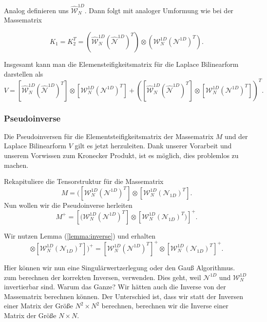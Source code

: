 Analog definieren uns $\widehat{\mathcal{W}}^{1D}_N$.
Dann folgt mit analoger Umformung wie bei der Massematrix

\begin{equation}
K_1 = K_2^T = (\widehat{\mathcal{W}}_N^{1D} (\widehat{\mathcal{N}}^{1D})^T) \otimes (\mathcal{W}_N^{1D} (\mathcal{N}^{1D})^T).
\end{equation}


Insgesamt kann man die Elemensteifigkeitsmatrix für die Laplace Bilinearform darstellen als
\begin{equation}
V =[\widehat{\mathcal{W}}_N^{1D} (\widehat{\mathcal{N}}^{1D})^T] \otimes [\mathcal{W}_N^{1D} (\mathcal{N}^{1D})^T] + ([\widehat{\mathcal{W}}_N^{1D} (\widehat{\mathcal{N}}^{1D})^T] \otimes [\mathcal{W}_N^{1D} (\mathcal{N}^{1D})^T])^T.
\end{equation}


\subsubsection{Pseudoinverse}

Die Pseudoinversen für die Elementsteifigkeitsmatrix der Massematrix $M$ und der Laplace Bilinearform $V$ gilt es jetzt herzuleiten. Dank unserer Vorarbeit und unserem Vorwissen zum Kronecker Produkt, ist es möglich, dies problemlos zu machen.

Rekapituliere die Tensorstruktur für die Massematrix
\begin{equation}
M =  ([\mathcal{W}_N^{1D} (\mathcal{N}^{1D})^T] \otimes [\mathcal{W}_N^{1D} (\mathcal{N}_{1D})^T].
\end{equation}
Nun wollen wir die Pseudoinverse herleiten
\begin{equation}
M^+=  [(\mathcal{W}_N^{1D} (\mathcal{N}^{1D})^T] \otimes [\mathcal{W}_N^{1D} (\mathcal{N}_{1D})^T)]^+ .
\end{equation}

Wir nutzen Lemma (\ref{lemma:inverse}) und erhalten
\begin{equation}
[(\mathcal{W}_N^{1D} (\mathcal{N}^{1D})^T] \otimes [\mathcal{W}_N^{1D} (\mathcal{N}_{1D})^T])^+ =  [\mathcal{W}_N^{1D} (\mathcal{N}^{1D})^T]^+ \otimes [\mathcal{W}_N^{1D} (\mathcal{N}_{1D})^T]^+.
\end{equation}

Hier können wir nun eine Singulärwertzerlegung oder den Gauß Algorithmus. zum berechnen der korrekten Inversen, verwenden. Dies geht, weil  $\mathcal{N}^{1D}$ und $\mathcal{W}_N^{1D}$ invertierbar sind.  Warum das Ganze? Wir hätten auch die Inverse von der Massematrix berechnen können. Der Unterschied ist, dass wir statt der Inversen einer Matrix der Größe $N^2 \times N^2$ berechnen, berechnen wir die Inverse einer Matrix der Größe $N \times N$.

